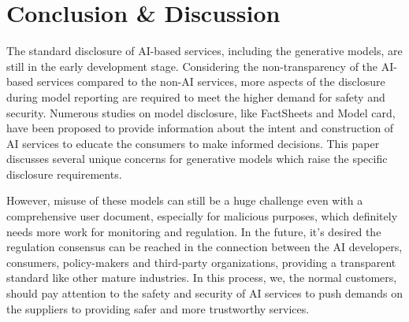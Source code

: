 \documentclass[conference]{IEEEtran}
\begin{document}
\section*{Conclusion \& Discussion}
The standard disclosure of AI-based services, including the generative models, are still in the early development stage.
Considering the non-transparency of the AI-based services compared to the non-AI services, 
more aspects of the disclosure during model reporting are required to meet the higher demand for safety and security. 
Numerous studies on model disclosure, like FactSheets and Model card, have been proposed to provide information about the intent and construction of AI services to educate the consumers to make informed decisions. 
This paper discusses several unique concerns for generative models which raise the specific disclosure requirements. 

However, misuse of these models can still be a huge challenge even with a comprehensive user document, especially for malicious purposes, which definitely needs more work for monitoring and regulation. 
In the future, it's desired the regulation consensus can be reached in the connection between the AI developers, consumers, policy-makers and third-party organizations, providing a transparent standard like other mature industries. 
In this process, we, the normal customers, should pay attention to the safety and security of AI services to push demands on the suppliers to providing safer and more trustworthy services.
\end{document}
